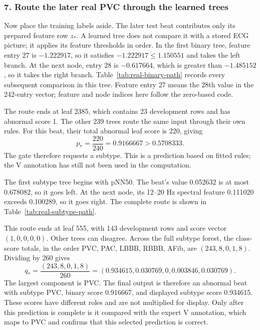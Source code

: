 \subsubsection*{7. Route the later real PVC through the learned trees}

Now place the training labels aside. The later test beat contributes only
its prepared feature row $z_*$. A learned tree does not compare it with a
stored ECG picture; it applies its feature thresholds in order. In the first
binary tree, feature entry 27 is $-1.222917$, so it satisfies
$-1.222917\leq1.150551$ and takes the left branch. At the next node,
entry 28 is $-0.617664$, which is greater than $-1.485152$, so it takes
the right branch. Table~\ref{tab:real-binary-path} records every subsequent
comparison in this tree. Feature entry 27 means the 28th value in the
242-entry vector; feature and node indices here follow the zero-based code.



The route ends at leaf 2385, which contains 23 development rows and has
abnormal score 1. The other 239 trees route the same input through their own
rules. For this beat, their total abnormal leaf score is 220, giving
\begin{equation}
 p_*=\frac{220}{240}=0.9166667>0.5708333.
 \label{eq:real-binary-prediction}
\end{equation}
The gate therefore requests a subtype. This is a prediction based on fitted
rules; the V annotation has still not been used in the computation.

The first subtype tree begins with pNN50. The beat's value 0.052632 is at
most 0.678082, so it goes left. At the next node, its 12--20 Hz spectral
feature 0.111020 exceeds 0.100289, so it goes right. The complete route is
shown in Table~\ref{tab:real-subtype-path}.



This route ends at leaf 555, with 143 development rows and score vector
$(1,0,0,0,0)$. Other trees can disagree. Across the full subtype forest,
the class-score totals, in the order PVC, PAC, LBBB, RBBB, AFib, are
$(243,8,0,1,8)$. Dividing by 260 gives
\begin{equation}
 q_* = \frac{(243,8,0,1,8)}{260}
      =(0.934615,0.030769,0,0.003846,0.030769).
 \label{eq:real-subtype-prediction}
\end{equation}
The largest component is PVC. The final output is therefore an abnormal
beat with subtype PVC, binary score 0.916667, and displayed subtype score
0.934615. These scores have different roles and are not multiplied for
display. Only after this prediction is complete is it compared with the
expert V annotation, which maps to PVC and confirms that this selected
prediction is correct.

